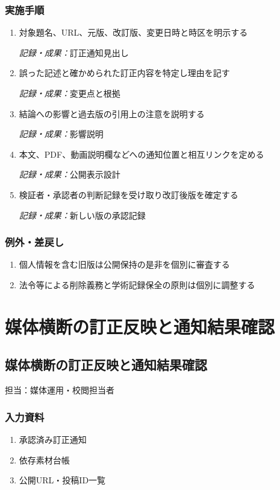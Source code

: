 \documentclass[a4paper,11pt]{article}
\begin{document}
\subsubsection*{実施手順}
\begin{enumerate}[leftmargin=2em,itemsep=0.65em]
\item 対象題名、URL、元版、改訂版、変更日時と時区を明示する\par\noindent\textit{記録・成果：}訂正通知見出し\nobreak\smallskip
\item 誤った記述と確かめられた訂正内容を特定し理由を記す\par\noindent\textit{記録・成果：}変更点と根拠\nobreak\smallskip
\item 結論への影響と過去版の引用上の注意を説明する\par\noindent\textit{記録・成果：}影響説明\nobreak\smallskip
\item 本文、PDF、動画説明欄などへの通知位置と相互リンクを定める\par\noindent\textit{記録・成果：}公開表示設計\nobreak\smallskip
\item 検証者・承認者の判断記録を受け取り改訂後版を確定する\par\noindent\textit{記録・成果：}新しい版の承認記録\nobreak\smallskip
\end{enumerate}
\subsubsection*{例外・差戻し}
\begin{enumerate}[leftmargin=2em,itemsep=0.35em]
\item 個人情報を含む旧版は公開保持の是非を個別に審査する
\item 法令等による削除義務と学術記録保全の原則は個別に調整する
\end{enumerate}
\section{媒体横断の訂正反映と通知結果確認}
\subsection{媒体横断の訂正反映と通知結果確認}
\par 担当：媒体運用・校閲担当者\par\medskip
\subsubsection*{入力資料}
\begin{enumerate}[leftmargin=2em,itemsep=0.35em]
\item 承認済み訂正通知
\item 依存素材台帳
\item 公開URL・投稿ID一覧
\end{enumerate}
\end{document}
